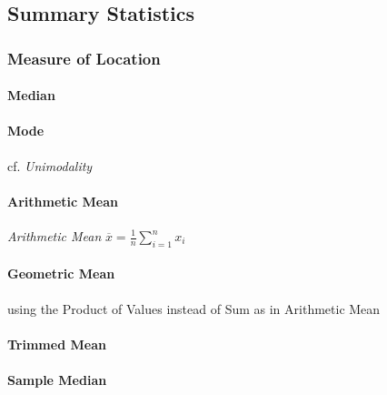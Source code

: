 \subsection{Summary Statistics}\label{sec:summary_statistics}

\subsubsection{Measure of Location}\label{sec:location_measure}

\paragraph{Median}\label{sec:median}\hfill

\paragraph{Mode}\label{sec:mode}\hfill

cf. \emph{Unimodality}



\paragraph{Arithmetic Mean}\label{sec:arithmetic_mean}\hfill

\emph{Arithmetic Mean} $\overline{x} = \frac{1}{n}\sum_{i=1}^n x_i$



\paragraph{Geometric Mean}\label{sec:geometric_mean}\hfill

using the Product of Values instead of Sum as in Arithmetic Mean



\paragraph{Trimmed Mean}\label{sec:trimmed_mean}\hfill

\paragraph{Sample Median}\label{sec:median}\hfill



